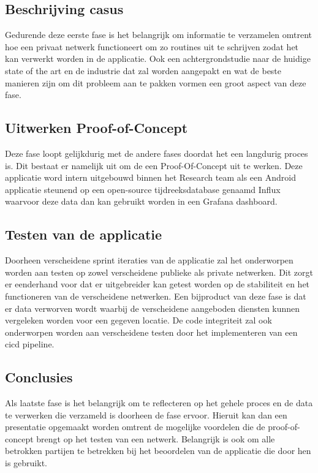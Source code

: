 \subsection{Beschrijving casus}
\label{subsub:beschrijving}

Gedurende deze eerste fase is het belangrijk om informatie te verzamelen omtrent hoe een privaat netwerk functioneert om zo routines uit te schrijven zodat het kan verwerkt worden in de applicatie. Ook een achtergrondstudie naar de huidige state of the art en de industrie dat zal worden aangepakt en wat de beste manieren zijn om dit probleem aan te pakken vormen een groot aspect van deze fase.
\\
\subsection{Uitwerken Proof-of-Concept}
\label{subsub:uitwerking}

Deze fase loopt gelijkdurig met de andere fases doordat het een langdurig proces is. Dit bestaat er namelijk uit om de een Proof-Of-Concept uit te werken. Deze applicatie word intern uitgebouwd binnen het Research team als een Android applicatie steunend op een open-source tijdreeksdatabase genaamd Influx waarvoor deze data dan kan gebruikt worden in een Grafana dashboard.

\subsection{Testen van de applicatie}
\label{subsub:testfase}

Doorheen verscheidene sprint iteraties van de applicatie zal het onderworpen worden aan testen op zowel verscheidene publieke als private netwerken. Dit zorgt er eenderhand voor dat er uitgebreider kan getest worden op de stabiliteit en het functioneren van de verscheidene netwerken. Een bijproduct van deze fase is dat er data verworven wordt waarbij de verscheidene aangeboden diensten kunnen vergeleken worden voor een gegeven locatie. De code integriteit zal ook onderworpen worden aan verscheidene testen door het implementeren van een cicd pipeline.

\subsection{Conclusies}
\label{subsub:conclusies}

Als laatste fase is het belangrijk om te reflecteren op het gehele proces en de data te verwerken die verzameld is doorheen de fase ervoor. Hieruit kan dan een presentatie opgemaakt worden omtrent de mogelijke voordelen die de proof-of-concept brengt op het testen van een netwerk. Belangrijk is ook om alle betrokken partijen te betrekken bij het beoordelen van de applicatie die door hen is gebruikt. 



